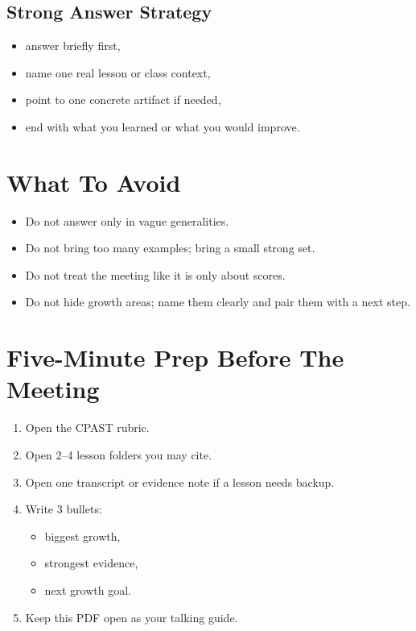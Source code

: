 \documentclass[11pt]{article}
\begin{document}
\subsection{Strong Answer Strategy}

\begin{itemize}[leftmargin=*]
  \item answer briefly first,
  \item name one real lesson or class context,
  \item point to one concrete artifact if needed,
  \item end with what you learned or what you would improve.
\end{itemize}

\section{What To Avoid}

\begin{itemize}[leftmargin=*]
  \item Do not answer only in vague generalities.
  \item Do not bring too many examples; bring a small strong set.
  \item Do not treat the meeting like it is only about scores.
  \item Do not hide growth areas; name them clearly and pair them with a next step.
\end{itemize}

\section{Five-Minute Prep Before The Meeting}

\begin{enumerate}[leftmargin=*]
  \item Open the CPAST rubric.
  \item Open 2--4 lesson folders you may cite.
  \item Open one transcript or evidence note if a lesson needs backup.
  \item Write 3 bullets:
  \begin{itemize}[leftmargin=*]
    \item biggest growth,
    \item strongest evidence,
    \item next growth goal.
  \end{itemize}
  \item Keep this PDF open as your talking guide.
\end{enumerate}
\end{document}
